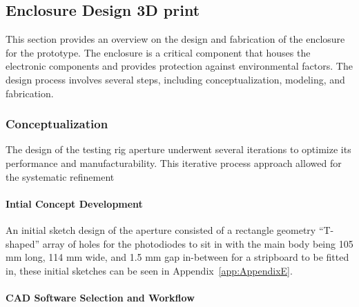 \subsection{Enclosure Design 3D print}  %
\label{subsec:enclosureDesign}
This section provides an overview on the design and fabrication of the enclosure for the prototype. 
The enclosure is a critical component that houses the electronic components and provides protection against environmental factors. 
The design process involves several steps, including conceptualization, modeling, and fabrication.


\subsubsection{Conceptualization}
The design of the testing rig aperture underwent several iterations to optimize its performance and manufacturability. 
This iterative process approach allowed for the systematic refinement

\paragraph{Intial Concept Development}

An initial sketch design of the aperture consisted of a rectangle geometry “T-shaped” array of holes for the photodiodes to sit in with the main body being 105 mm long, 114 mm wide, and 1.5 mm gap in-between for a stripboard to be fitted in, these initial sketches can be seen in Appendix~\ref{app:AppendixE}.

\paragraph{CAD Software Selection and Workflow} 

